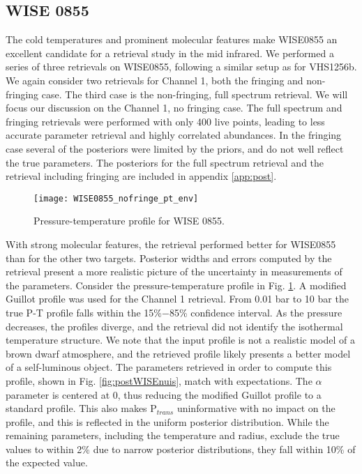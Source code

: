 \subsection{WISE 0855}
The cold temperatures and prominent molecular features make WISE0855 an excellent candidate for a retrieval study in the mid infrared.
We performed a series of three retrievals on WISE0855, following a similar setup as for VHS1256b.
We again consider two retrievals for Channel 1, both the fringing and non-fringing case.
The third case is the non-fringing, full spectrum retrieval.
We will focus our discussion on the Channel 1, no fringing case.
The full spectrum and fringing retrievals were performed with only 400 live points, leading to less accurate parameter retrieval and highly correlated abundances.
In the fringing case several of the posteriors were limited by the priors, and do not well reflect the true parameters.
The posteriors for the full spectrum retrieval and the retrieval including fringing are included in appendix \ref{app:post}.

\begin{figure}[t]
	\texttt{[image: WISE0855\_nofringe\_pt\_env]}
	\caption{Pressure-temperature profile for WISE 0855.}
	\label{fig:presWISE}
\end{figure}
With strong molecular features, the retrieval performed better for WISE0855 than for the other two targets.
Posterior widths and errors computed by the retrieval present a more realistic picture of the uncertainty in measurements of the parameters.
Consider the pressure-temperature profile in Fig. \ref{fig:presWISE}.
A modified Guillot profile was used for the Channel 1 retrieval.
From 0.01 bar to 10 bar the true P-T profile falls within the 15\%$-$85\% confidence interval.
As the pressure decreases, the profiles diverge, and the retrieval did not identify the isothermal temperature structure.
We note that the input profile is not a realistic model of a brown dwarf atmosphere, and the retrieved profile likely presents a better model of a self-luminous object.
The parameters retrieved in order to compute this profile, shown in Fig. \ref{fig:postWISEnuis}, match with expectations.
The $\alpha$ parameter is centered at $0$, thus reducing the modified Guillot profile to a standard profile.
This also makes P$_{trans}$ uninformative with no impact on the profile, and this is reflected in the uniform posterior distribution.
While the remaining parameters, including the temperature and radius, exclude the true values to within 2\% due to narrow posterior distributions, they fall within 10\% of the expected value.

